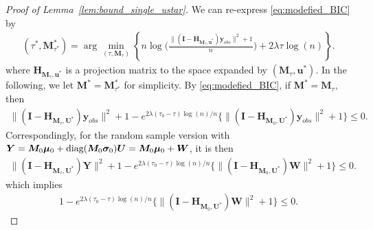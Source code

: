 \documentclass[12pt]{article}
\theoremstyle{shortspace}
\def\*#1{\bm{#1}}
\newcommand{\diag}{\hbox{diag}}
\begin{document}
\begin{proof}[Proof of Lemma~\ref{lem:bound_single_ustar}]

We can re-express 
\eqref{eq:modefied_BIC} by 
\begin{align*}
(\tau^*, \*M^*_{\tau^*}) = \arg\min\limits_{(\tau, \*M_\tau)}   \left\{n\log \bigg(\frac{\|(\*I-\*H_{\*M_\tau, \*u^*})\*y_{obs}\|^2+1}{n}\bigg) + 2\lambda\tau\log(n)\right\}.
\end{align*}
where $\*H_{\*M_\tau, \*u^*}$ is a projection matrix to the space expanded by  $(\*M_\tau, \*u^*)$. In the following, we let $\*M^* = \*M^*_{\tau^*}$ for simplicity.  
By \eqref{eq:modefied_BIC},  if $\*M^* = \*M_{\tau},$ then
\begin{align*}
    \|(\*I - \*H_{\*M_{\tau}, \*U^*}) \*y_{obs}\|^2 + 1  - e^{2\lambda(\tau_0-\tau)\log(n)/n} \{\|(\*I - \*H_{\*M_0, \*U^*}) \*y_{obs}\|^2 +1\} \leq 0.
\end{align*} 
Correspondingly, for the random sample version with $\*Y = {\*M_0} {\*\mu_0} + \diag(\*M_0 {\*\sigma_0}) \*U = {\*M_0} {\*\mu_0} + \*W$, it  
is then
\begin{align}
\label{eq:A3_inequality1}
    \|(\*I - \*H_{\*M_{\tau}, \*U^*}) \*Y\|^2 + 1  - e^{2\lambda(\tau_0-\tau)\log(n)/n} \{\|(\*I - \*H_{\*M_0, \*U^*}) \*W\|^2 +1\} \leq 0.
\end{align} 
which implies 
\begin{align}
\label{eq:A3_inequality1a}
     1  - e^{2\lambda(\tau_0-\tau)\log(n)/n} \{\|(\*I - \*H_{\*M_0, \*U^*}) \*W\|^2+1\} \leq 0.
\end{align} 


\end{proof}
\end{document}
